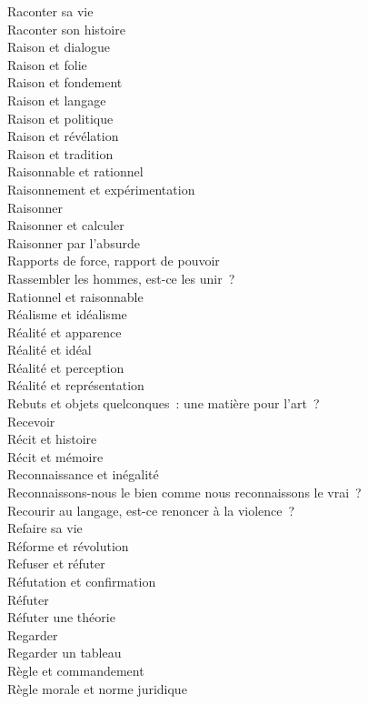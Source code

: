 \documentclass[a4paper,12pt]{article}
\begin{document}
Raconter sa vie \\
Raconter son histoire \\
Raison et dialogue \\
Raison et folie \\
Raison et fondement \\
Raison et langage \\
Raison et politique \\
Raison et révélation \\
Raison et tradition \\
Raisonnable et rationnel \\
Raisonnement et expérimentation \\
Raisonner \\
Raisonner et calculer \\
Raisonner par l'absurde \\
Rapports de force, rapport de pouvoir \\
Rassembler les hommes, est-ce les unir ? \\
Rationnel et raisonnable \\
Réalisme et idéalisme \\
Réalité et apparence \\
Réalité et idéal \\
Réalité et perception \\
Réalité et représentation \\
Rebuts et objets quelconques : une matière pour l'art ? \\
Recevoir \\
Récit et histoire \\
Récit et mémoire \\
Reconnaissance et inégalité \\
Reconnaissons-nous le bien comme nous reconnaissons le vrai ? \\
Recourir au langage, est-ce renoncer à la violence ? \\
Refaire sa vie \\
Réforme et révolution \\
Refuser et réfuter \\
Réfutation et confirmation \\
Réfuter \\
Réfuter une théorie \\
Regarder \\
Regarder un tableau \\
Règle et commandement \\
Règle morale et norme juridique \\
\end{document}
